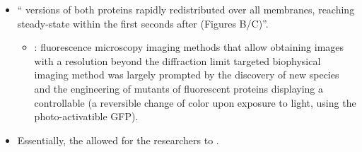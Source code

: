 \documentclass[basic,plain]{inVerba-notes}
\begin{document}
\begin{itemize}
  \item `` versions of both proteins rapidly redistributed over all membranes, reaching steady-state within the first seconds after  (Figures B/C)''. 
    \begin{itemize}
      \item {}: fluorescence microscopy imaging methods that allow obtaining images with a resolution beyond the diffraction limit targeted biophysical imaging method was largely prompted by the discovery of new species and the engineering of mutants of fluorescent proteins displaying a controllable  (a reversible change of color upon exposure to light, using the photo-activatible GFP).
    \end{itemize}
  \item Essentially, the  allowed for the researchers to . 
\end{itemize}

\medskip
\begin{center}
\end{center}  
\medskip 
\end{document}
